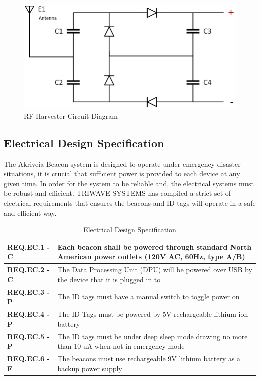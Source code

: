 \medskip
\begin{figure}[H]
\centering
    \includegraphics[scale=0.5]{./images/rf_circuit.png}
    \caption{RF Harvester Circuit Diagram}
    \label{rf_c}
\end{figure}

\pagebreak
\subsection{Electrical Design Specification}
\medskip
The Akriveia Beacon system is designed to operate under emergency disaster situations, it is crucial that sufficient power is provided to each device at any given time. In order for the system to be reliable and, the electrical systems must be robust and efficient. TRIWAVE SYSTEMS has compiled a strict set of electrical requirements that ensures the beacons and ID tags will operate in a safe and efficient way.
\medskip
\bgroup
\def\arraystretch{1.5}
\begin{table}[H]
\centering
\begin{tabular}{ | m{3cm} | m{12.5cm} |}
\hline
\textbf{REQ.EC.1 - C} &  Each beacon shall be powered through standard North American power outlets (120V AC, 60Hz, type A/B)\\
\hline
\textbf{REQ.EC.2 - C} &  The Data Processing Unit (DPU) will be powered over USB by the device that it is plugged in to\\
\hline
\textbf{REQ.EC.3 - P} &  The ID tags must have a manual switch to toggle power on \\
\hline
\textbf{REQ.EC.4 - P} &  The ID Tags must be powered by 5V rechargeable lithium ion battery\\
\hline
\textbf{REQ.EC.5 - P} &  The ID tags must be under deep sleep mode drawing no more than 10 uA when not in emergency mode\\
\hline
\textbf{REQ.EC.6 - F} &  The beacons must use rechargeable 9V lithium battery as a backup power supply\\
\hline
\end{tabular}
\caption{Electrical Design Specification}
\end{table}
